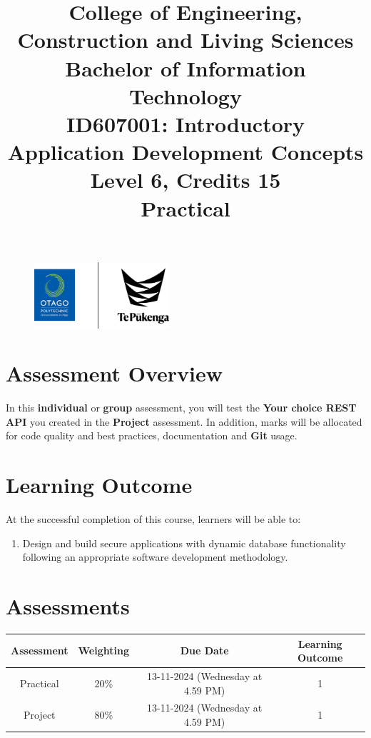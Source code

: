 \documentclass{article}
\author{}
\begin{document}
\begin{figure}
    \centering
    \includegraphics[width=50mm]{../img/logo.png}
\end{figure}

\title{College of Engineering, Construction and Living Sciences\\Bachelor of Information Technology\\ID607001: Introductory Application Development Concepts\\Level 6, Credits 15\\\textbf{Practical}}
\date{}
\maketitle

\section*{Assessment Overview}
In this \textbf{individual} or \textbf{group} assessment, you will test the \textbf{Your choice REST API} you created in the \textbf{Project} assessment. In addition, marks will be allocated for code quality and best practices, documentation and \textbf{Git} usage.  

\section*{Learning Outcome}
At the successful completion of this course, learners will be able to:
\begin{enumerate}
	\item Design and build secure applications with dynamic database functionality following an appropriate software development methodology.
\end{enumerate}

\section*{Assessments}
\renewcommand{\arraystretch}{1.5}
\begin{tabular}{|c|c|c|c|}
	\hline
	\textbf{Assessment}                                 & \textbf{Weighting} & \textbf{Due Date}            & \textbf{Learning Outcome} \\ \hline
	\small Practical & \small 20\%        & \small 13-11-2024 (Wednesday at 4.59 PM)   & \small 1                   \\ \hline
	\small Project                 & \small 80\%        & \small 13-11-2024 (Wednesday at 4.59 PM) \small  & \small 1                   \\ \hline
\end{tabular}
\end{document}
